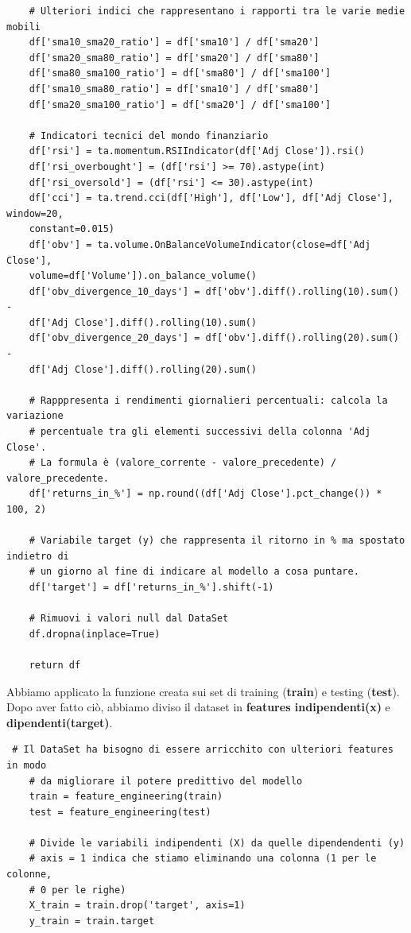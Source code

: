 \documentclass{article}
\begin{document}
\begin{verbatim}
    # Ulteriori indici che rappresentano i rapporti tra le varie medie mobili
    df['sma10_sma20_ratio'] = df['sma10'] / df['sma20']
    df['sma20_sma80_ratio'] = df['sma20'] / df['sma80']
    df['sma80_sma100_ratio'] = df['sma80'] / df['sma100']
    df['sma10_sma80_ratio'] = df['sma10'] / df['sma80']
    df['sma20_sma100_ratio'] = df['sma20'] / df['sma100']

    # Indicatori tecnici del mondo finanziario
    df['rsi'] = ta.momentum.RSIIndicator(df['Adj Close']).rsi()
    df['rsi_overbought'] = (df['rsi'] >= 70).astype(int)
    df['rsi_oversold'] = (df['rsi'] <= 30).astype(int)
    df['cci'] = ta.trend.cci(df['High'], df['Low'], df['Adj Close'], window=20,
    constant=0.015)
    df['obv'] = ta.volume.OnBalanceVolumeIndicator(close=df['Adj Close'], 
    volume=df['Volume']).on_balance_volume()
    df['obv_divergence_10_days'] = df['obv'].diff().rolling(10).sum() - 
    df['Adj Close'].diff().rolling(10).sum()
    df['obv_divergence_20_days'] = df['obv'].diff().rolling(20).sum() - 
    df['Adj Close'].diff().rolling(20).sum()

    # Rapppresenta i rendimenti giornalieri percentuali: calcola la variazione
    # percentuale tra gli elementi successivi della colonna 'Adj Close'. 
    # La formula è (valore_corrente - valore_precedente) / valore_precedente.
    df['returns_in_%'] = np.round((df['Adj Close'].pct_change()) * 100, 2)

    # Variabile target (y) che rappresenta il ritorno in % ma spostato indietro di
    # un giorno al fine di indicare al modello a cosa puntare.
    df['target'] = df['returns_in_%'].shift(-1)

    # Rimuovi i valori null dal DataSet
    df.dropna(inplace=True)

    return df
\end{verbatim}
Abbiamo applicato la funzione creata sui set di training (\textbf{train}) e testing (\textbf{test}). Dopo aver fatto ciò, abbiamo diviso il dataset in \textbf{features indipendenti(x)} e \textbf{dipendenti(target)}.
\begin{verbatim}
 # Il DataSet ha bisogno di essere arricchito con ulteriori features in modo
    # da migliorare il potere predittivo del modello
    train = feature_engineering(train)
    test = feature_engineering(test)

    # Divide le variabili indipendenti (X) da quelle dipendendenti (y)
    # axis = 1 indica che stiamo eliminando una colonna (1 per le colonne, 
    # 0 per le righe)
    X_train = train.drop('target', axis=1)
    y_train = train.target
\end{verbatim}
\end{document}
